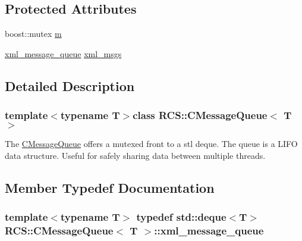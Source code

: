 \subsection*{Protected Attributes}
\begin{DoxyCompactItemize}
\item 
boost\-::mutex \hyperlink{classRCS_1_1CMessageQueue_a874fdf08657e4ca2da89168bb6176c49}{m}
\item 
\hyperlink{classRCS_1_1CMessageQueue_a272ec6240c0ae616f66e71a033326e28}{xml\-\_\-message\-\_\-queue} \hyperlink{classRCS_1_1CMessageQueue_aa699f0b2f9f057242c5f0d3882f14ecb}{xml\-\_\-msgs}
\end{DoxyCompactItemize}


\subsection{Detailed Description}
\subsubsection*{template$<$typename T$>$class R\-C\-S\-::\-C\-Message\-Queue$<$ T $>$}

The \hyperlink{classRCS_1_1CMessageQueue}{C\-Message\-Queue} offers a mutexed front to a stl deque. The queue is a L\-I\-F\-O data structure. Useful for safely sharing data between multiple threads. 

\subsection{Member Typedef Documentation}
\hypertarget{classRCS_1_1CMessageQueue_a272ec6240c0ae616f66e71a033326e28}{
\subsubsection[{xml\-\_\-message\-\_\-queue}]{\setlength{\rightskip}{0pt plus 5cm}template$<$typename T$>$ typedef std\-::deque$<$T$>$ {\bf R\-C\-S\-::\-C\-Message\-Queue}$<$ T $>$\-::{\bf xml\-\_\-message\-\_\-queue}}}\label{classRCS_1_1CMessageQueue_a272ec6240c0ae616f66e71a033326e28}


